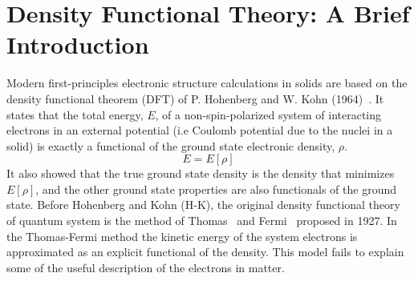\section{Density Functional Theory: A Brief Introduction}
Modern first-principles electronic structure calculations in solids are based on the density functional theorem (DFT) of P. Hohenberg and W. Kohn (1964)~\cite{hohenberg1964inhomogeneous}. It states that the total energy, $E$, of a non-spin-polarized system of interacting electrons in an external potential (i.e Coulomb potential due to the nuclei in a solid) is exactly a functional of the ground state electronic density, $\rho$.
\begin{equation}
E = E[\rho]
\end{equation}
It also showed that the true ground state density is the density that minimizes $E[\rho]$, and the other ground state properties are also functionals of the ground state. Before Hohenberg and Kohn (H-K), the original density functional theory of quantum system is the method of Thomas~\cite{thomas1927calculation} and Fermi~\cite{fermi1927metodo} proposed in 1927. In the Thomas-Fermi method the kinetic energy of the system electrons is approximated as an explicit functional of the density. This model fails to explain some of the useful description of the electrons in matter.

